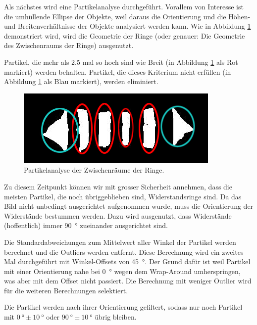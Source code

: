 Als  n\"achstes  wird  eine   Partikelanalyse   durchgef\"uhrt.  Vorallem  von
Interesse  ist  die  umh\"ullende  Ellipse  der   Objekte,   weil  daraus  die
Orientierung und die H\"ohen- und Breitenverh\"altnisse der Objekte analysiert
werden  kann.  Wie  in  Abbildung  \ref{fig:4}  demonstriert  wird,  wird  die
Geometrie der  Ringe (oder genauer: Die Geometrie des Zwischenraums der Ringe)
ausgenutzt.

Partikel, die mehr als  $2.5$  mal  so  hoch  sind  wie  Breit  (in  Abbildung
\ref{fig:4} als Rot  markiert) werden behalten. Partikel, die dieses Kriterium
nicht  erf\"ullen  (in  Abbildung  \ref{fig:4}  als  Blau  markiert),   werden
eliminiert.

\begin{figure}[H]
    \centering
    \includegraphics[width=.7\linewidth]{images/4}
    \caption{Partikelanalyse der Zwischenr\"aume der Ringe.}
    \label{fig:4}
\end{figure} 

Zu diesem Zeitpunkt k\"onnen  wir  mit  grosser  Sicherheit annehmen, dass die
meisten  Partikel,  die  noch \"ubriggeblieben sind, Widerstandsringe sind. Da
das Bild nicht unbedingt ausgerichtet aufgenommen wurde, muss die Orientierung
der Widerst\"ande  bestummen  werden. Dazu wird ausgenutzt, dass Widerst\"ande
(hoffentlich)   immer   \SI{90}{\degree}    zueinander    ausgerichtet   sind.

Die  Standardabweichungen  zum  Mittelwert  aller  Winkel  der Partikel werden
berechnet und die Outliers werden entfernt. Diese  Berechnung wird ein zweites
Mal durchgef\"uhrt mit  Winkel-Offsets von \SI{45}{\degree}. Der Grund daf\"ur
ist  weil  Partikel mit einer Orientierung nahe bei \SI{0}{\degree} wegen  dem
Wrap-Around  umherspringen,  was  aber  mit dem  Offset  nicht  passiert.  Die
Berechnung   mit  weniger  Outlier  wird  f\"ur  die   weiteren   Berechnungen
selektiert.

Die  Partikel  werden nach  ihrer  Orientierung  gefiltert,  sodass  nur  noch
Partikel mit $\SI{0}{\degree} \pm \SI{10}{\degree}$ oder $\SI{90}{\degree} \pm
\SI{10}{\degree}$ \"ubrig bleiben.

